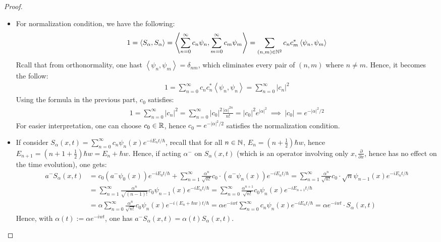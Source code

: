 \documentclass{article}
\begin{document}
\begin{proof}
\begin{itemize}
        \item[(e)] For normalization condition, we have the following:
        \begin{align}
            1=\left<S_\alpha,S_\alpha\right>=\left<\sum_{n=0}^{\infty}c_n \psi_n, \sum_{m=0}^{\infty}c_m\psi_m\right> = \sum_{(n,m)\in\mathbb{N}^2}c_n c_m^*\left<\psi_n,\psi_m\right>
        \end{align}
        Rcall that from orthonormality, one hast $\left<\psi_n,\psi_m\right>=\delta_{n m}$, which eliminates every pair of $(n,m)$ where $n\neq m$. Hence, it becomes the follow:
        \begin{align}
            1=\sum_{n=0}^{\infty}c_n c_n^*\left<\psi_n,\psi_n\right>=\sum_{n=0}^{\infty}|c_n|^2
        \end{align}
        Using the formula in the previous part, $c_0$ satisfies:
        \begin{align}
            1=\sum_{n=0}^{\infty}|c_n|^2 = \sum_{n=0}^{\infty}|c_0|^2 \frac{|\alpha|^{2n}}{n!} = |c_0|^2 e^{|\alpha|^2}\ \implies\ |c_0| = e^{-|\alpha|^2/2}
        \end{align}
        For easier interpretation, one can choose $c_0\in\mathbb{R}$, hence $c_0=e^{-|\alpha|^2/2}$ satisfies the normalization condition.

        \hfil

        \item[(f)] If consider $S_\alpha(x,t)=\sum_{n=0}^{\infty}c_n \psi_n(x)e^{-i E_n t/\hbar}$, recall that for all $n\in\mathbb{N}$, $E_n=\left(n+\frac{1}{2}\right)\hbar w$, hence $E_{n+1}=\left(n+1+\frac{1}{2}\right)\hbar w=E_n+\hbar w$. Hence, if acting $\alpha^-$ on $S_\alpha(x,t)$ (which is an operator involving only $x,\frac{\partial}{\partial x}$, hence has no effect on the time evolution), one gets:
        \begin{align}
            a^- S_\alpha(x,t)&=c_0(a^-\psi_0(x))e^{-i E_0t/\hbar}+\sum_{n=1}^{\infty}\frac{\alpha^n}{\sqrt{n!}}c_0 \cdot (a^-\psi_n(x))e^{-i E_n t/\hbar} = \sum_{n=1}^{\infty}\frac{\alpha^n}{\sqrt{n!}}c_0 \cdot \sqrt{n}\psi_{n-1}(x)e^{-i E_nt/\hbar}\\
            &= \sum_{n=1}^{\infty}\frac{\alpha^n}{\sqrt{(n-1)!}}c_0\psi_{n-1}(x)e^{-i E_nt/\hbar}=\sum_{n=0}^{\infty}\frac{\alpha^{n+1}}{\sqrt{n!}}c_0\psi_n(x)e^{-i E_{n+1}t/\hbar}\\ 
            &= \alpha\sum_{n=0}^{\infty}\frac{\alpha^n}{\sqrt{n!}}c_0\psi_n(x)e^{-i(E_n+\hbar w)t/\hbar}=\alpha e^{-iwt}\sum_{n=0}^{\infty}c_n \psi_n(x)e^{-i E_nt/\hbar} = \alpha e^{-iwt}\cdot S_\alpha(x,t)
        \end{align}
        Hence, with $\alpha(t):=\alpha e^{-iwt}$, one has $a^-S_\alpha(x,t)=\alpha(t) S_\alpha(x,t)$. 
        

\end{itemize}
\end{proof}
\end{document}
